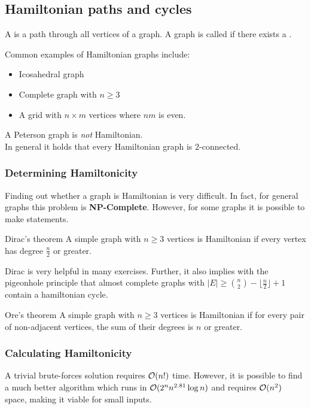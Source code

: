 \documentclass[a3paper, landscape, 11pt]{article} %
\begin{document}
\begin{multicols*}{4}
\hrulefill %

\subsection*{Hamiltonian paths and cycles}
A  is a path through all vertices of a graph. A graph is called  if there exists a .

Common examples of Hamiltonian graphs include:
\begin{itemize}[noitemsep, label=-]
	\item Icosahedral graph
	\item Complete graph with $n \ge 3$
	\item A grid with $n \times m$ vertices where $nm$ is even.
\end{itemize}
A Peterson graph is \textit{not} Hamiltonian.\\ In general it holds that every Hamiltonian graph is 2-connected.
\vfill %

\subsubsection*{Determining Hamiltonicity}
Finding out whether a graph is Hamiltonian is very difficult. In fact, for general graphs this problem is \textbf{NP-Complete}. However, for some graphs it is possible to make statements.\\
\begin{mainbox}{Dirac's theorem}
A simple graph with $n \ge 3$ vertices is Hamiltonian if every vertex has degree $\frac{n}{2}$ or greater.
\end{mainbox}
Dirac is very helpful in many exercises. Further, it also implies with the pigeonhole principle that almost complete graphs with $|E| \ge \binom{n}{2}- \lfloor \frac{n}{2} \rfloor +1$ contain a hamiltonian cycle.\\
\begin{mainbox}{Ore's theorem}
A simple graph with $n \ge 3$ vertices is Hamiltonian if for every pair of non-adjacent vertices, the sum of their degrees is $n$ or greater.
\end{mainbox}

\subsubsection*{Calculating Hamiltonicity}
A trivial brute-forces solution requires $\mathcal{O}(n!)$ time. However, it is possible to find a much better algorithm which runs in $\mathcal{O}(2^n n^{2.81}\operatorname{log}n)$ and requires $\mathcal{O}(n^2)$ space, making it viable for small inputs.






\end{multicols*}
\end{document}
